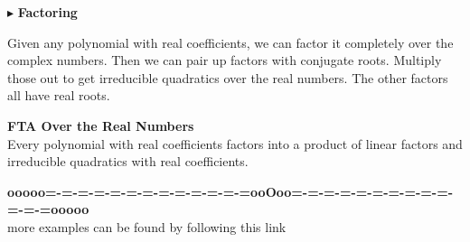 \documentclass{ximera}
\begin{document}
$\blacktriangleright$  \textbf{Factoring}




Given any polynomial with real coefficients, we can factor it completely over the complex numbers.  Then we can pair up factors with conjugate roots. Multiply those out to get irreducible quadratics over the real numbers.  The other factors all have real roots.





\begin{theorem}  \textbf{\textcolor{blue!55!black}{FTA Over the Real Numbers}} \\

Every polynomial with real coefficients factors into a product of linear factors and irreducible quadratics with real coefficients.



\end{theorem}




































































\begin{center}
\textbf{\textcolor{green!50!black}{ooooo=-=-=-=-=-=-=-=-=-=-=-=-=ooOoo=-=-=-=-=-=-=-=-=-=-=-=-=ooooo}} \\

more examples can be found by following this link\\ 

\end{center}
\end{document}
